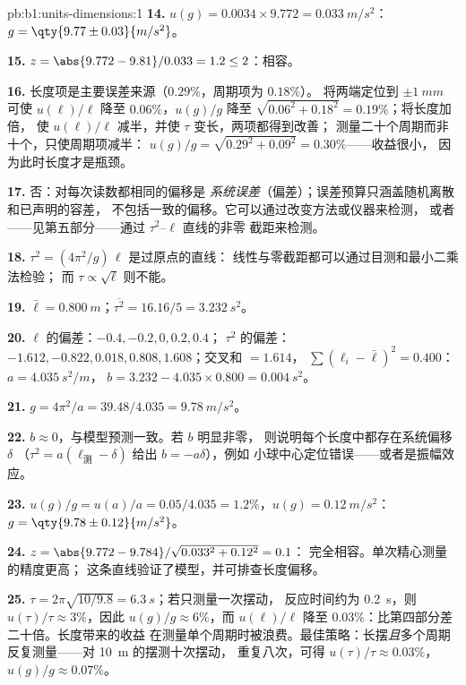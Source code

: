 \begin{solution}{pb:b1:units-dimensions:1}
\textbf{14.} $u(g) = 0.0034 \times 9.772 = \qty{0.033}{m/s^2}$：
$g = \qty{9.77\pm0.03}{m/s^2}$。

\textbf{15.} $z = \abs{9.772 - 9.81}/0.033 = 1.2 \leq 2$：相容。

\textbf{16.} 长度项是主要误差来源（$0.29\%$，周期项为 $0.18\%$）。
将两端定位到 $\pm\qty{1}{mm}$ 可使 $u(\ell)/\ell$ 降至
$0.06\%$，$u(g)/g$ 降至 $\sqrt{0.06^2 + 0.18^2} = 0.19\%$；将长度加倍，
使 $u(\ell)/\ell$ 减半，并使 $\tau$ 变长，两项都得到改善；
测量二十个周期而非十个，只使周期项减半：
$u(g)/g = \sqrt{0.29^2 + 0.09^2} = 0.30\%$——收益很小，
因为此时长度才是瓶颈。

\textbf{17.} 否：对每次读数都相同的偏移是
\emph{系统误差}（偏差）；误差预算只涵盖随机离散和已声明的容差，
不包括一致的偏移。它可以通过改变方法或仪器来检测，
或者——见第五部分——通过 $\tau^2$--$\ell$ 直线的非零
截距来检测。

\textbf{18.} $\tau^2 = (4\pi^2/g)\,\ell$ 是过原点的直线：
线性与零截距都可以通过目测和最小二乘法检验；
而 $\tau \propto \sqrt\ell$ 则不能。

\textbf{19.} $\bar\ell = \qty{0.800}{m}$；$\overline{\tau^2} = 16.16/5 =
\qty{3.232}{s^2}$。

\textbf{20.} $\ell$ 的偏差：$-0.4, -0.2, 0, 0.2, 0.4$；
$\tau^2$ 的偏差：$-1.612, -0.822, 0.018, 0.808, 1.608$；交叉和 $= 1.614$，
$\sum(\ell_i - \bar\ell)^2 = 0.400$：$a = \qty{4.035}{s^2/m}$，
$b = 3.232 - 4.035 \times 0.800 = \qty{0.004}{s^2}$。

\textbf{21.} $g = 4\pi^2/a = 39.48/4.035 = \qty{9.78}{m/s^2}$。

\textbf{22.} $b \approx 0$，与模型预测一致。若 $b$ 明显非零，
则说明每个长度中都存在系统偏移 $\delta$
（$\tau^2 = a(\ell_{\text{测}} - \delta)$ 给出 $b = -a\delta$），例如
小球中心定位错误——或者是振幅效应。

\textbf{23.} $u(g)/g = u(a)/a = 0.05/4.035 = 1.2\%$，$u(g) =
\qty{0.12}{m/s^2}$：$g = \qty{9.78\pm0.12}{m/s^2}$。

\textbf{24.} $z = \abs{9.772 - 9.784}/\sqrt{0.033^2 + 0.12^2} = 0.1$：
完全相容。单次精心测量的精度更高；
这条直线验证了模型，并可排查长度偏移。

\textbf{25.} $\tau = 2\pi\sqrt{10/9.8} = \qty{6.3}{s}$；若只测量一次摆动，
反应时间约为 \qty{0.2}{s}，则 $u(\tau)/\tau \approx
3\%$，因此 $u(g)/g \approx 6\%$，而 $u(\ell)/\ell$ 降至
$0.03\%$：比第四部分差二十倍。长度带来的收益
在测量单个周期时被浪费。最佳策略：长摆\emph{且}多个周期
反复测量——对 \qty{10}{m} 的摆测十次摆动，
重复八次，可得 $u(\tau)/\tau \approx 0.03\%$，$u(g)/g \approx 0.07\%$。
\end{solution}
